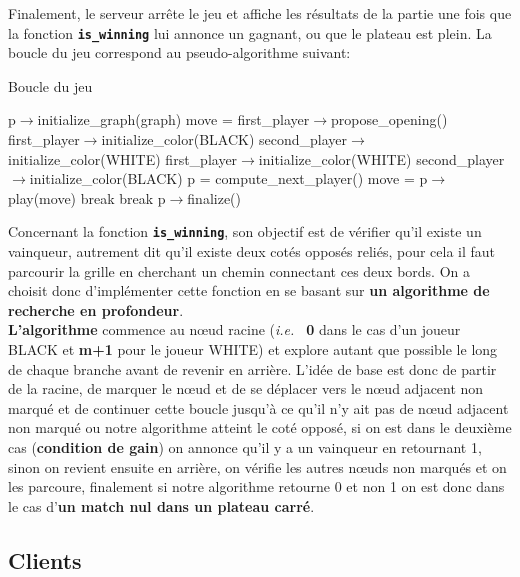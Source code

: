 \documentclass[a4paper,10pt]{article}
\begin{document}
Finalement, le serveur arrête le jeu et affiche les résultats de
la partie une fois que la fonction \textbf{\texttt{is\_winning}} lui annonce un gagnant, ou que le plateau est plein. La boucle du jeu correspond au pseudo-algorithme suivant:\\
\begin{algorithm}
\caption{Boucle du jeu}
\begin{algorithmic}
    \STATE p$\rightarrow$initialize\_graph(graph)
\ENDFOR    
\STATE move = first\_player$\rightarrow$propose\_opening()
\STATE first\_player$\rightarrow$initialize\_color(BLACK)
\STATE second\_player$\rightarrow$initialize\_color(WHITE)
\STATE first\_player$\rightarrow$initialize\_color(WHITE)
\STATE second\_player$\rightarrow$initialize\_color(BLACK)
\ENDIF
{} 
\STATE p = compute\_next\_player()
\STATE move = p$\rightarrow$play(move)
\STATE break
\ENDIF
{}
\STATE break
\ENDIF
\ENDWHILE
{}
\STATE p$\rightarrow$finalize()
\ENDFOR
\end{algorithmic}
\end{algorithm}
\newpage
Concernant la fonction \textbf{\texttt{is\_winning}}, son objectif est de vérifier qu'il existe un vainqueur, autrement dit qu'il existe deux cotés opposés reliés, pour cela il faut parcourir la grille en cherchant un chemin connectant ces deux bords. On a choisit donc d'implémenter cette fonction en se basant sur \textbf{un algorithme de recherche en profondeur}.\\

\textbf{L'algorithme} commence au nœud racine (\textit{i.e.\ } \textbf{0} dans le cas d'un joueur BLACK et \textbf{m+1} pour le joueur WHITE) et explore autant que possible le long de chaque branche avant de revenir en arrière. L'idée de base est donc de partir de la racine, de marquer le nœud et de se déplacer vers le nœud adjacent non marqué et de continuer cette boucle jusqu'à ce qu'il n'y ait pas de nœud adjacent non marqué ou notre algorithme atteint le coté opposé, si on est dans le deuxième cas (\textbf{condition de gain}) on annonce qu'il y a un vainqueur en retournant 1, sinon on revient ensuite en arrière, on vérifie les autres nœuds non marqués et on les parcoure, finalement si notre algorithme retourne 0 et non 1 on est donc dans le cas d'\textbf{un match nul dans un plateau carré}.
\subsection{Clients}
\end{document}
